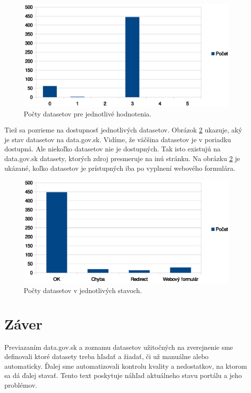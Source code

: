 \documentclass[12pt,a4paper]{article}
\begin{document}
\begin{figure}
\center \includegraphics[width=14cm]{stars}
\caption{Počty datasetov pre jednotlivé hodnotenia.}
\label{stars}
\end{figure}

Tiež sa pozrieme na dostupnosť jednotlivých datasetov. Obrázok \ref{status} ukazuje, aký je stav datasetov na data.gov.sk. Vidíme, že väčšina datasetov je v poriadku dostupná. Ale niekoľko datasetov nie je dostupných. Tak isto existujú na data.gov.sk datasety, ktorých zdroj presmeruje na inú stránku. Na obrázku \ref{status} je ukázané, koľko datasetov je prístupných iba po vyplnení webového formulára.

\begin{figure}
\center \includegraphics[width=14cm]{status}
\caption{Počty datasetov v jednotlivých stavoch.}
\label{status}
\end{figure}

\newpage
\section{Záver} 

Previazaním data.gov.sk a zoznamu datasetov užitočných na zverejnenie sme definovali ktoré datasety treba hľadať a žiadať, či už manuálne alebo automaticky. Ďalej sme automatizovali kontrolu kvality a nedostatkov, na ktorom sa dá ďalej stavať. Tento text poskytuje náhľad aktuálneho stavu portálu a jeho problémov. 
\end{document}
